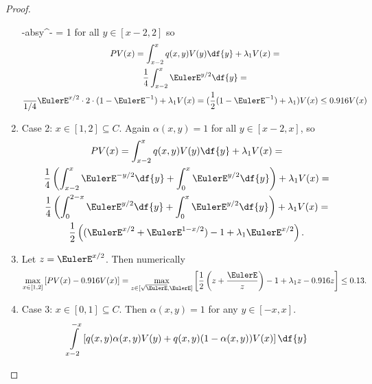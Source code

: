 \documentclass[12pt]{article}
\begin{document}
\begin{example}
\begin{proof}
\begin{enumerate}
{{                {-abs{y}}}{\EulerE^{-}}} = 1 \) for all \( y \in
                [x-2,2] \) so
                \begin{multline*}
                    PV(x) = \int_{x-2}^x q(x,y) V(y) \df{y} + \lambda_1
                    V(x) = \\
                    \frac{1}{4} \int_{x-2}^x \EulerE^{y/2} \df{y} =\\
                    \frac{}{1/4} \EulerE^{x/2}\cdot 2 \cdot (1 - \EulerE^
                    {-1}) + \lambda_1 V(x) = (\frac{1}{2}(1-\EulerE^{-1})
                    + \lambda_1) V(x) \le 0.916 V(x)
                \end{multline*}
            \item
                Case 2:  \( x \in [1,2] \subseteq C \).  Again \( \alpha
                (x,y) = 1 \) for all \( y \in [x-2,x] \), so
                \begin{multline*}
                    PV(x) = \int_{x-2}^x q(x,y) V(y) \df{y} + \lambda_1
                    V(x) = \\
                    \frac{1}{4} \left( \int_{x-2}^x \EulerE^{-y/2} \df{y}
                    + \int_0^x \EulerE^{y/2} \df{y} \right) + \lambda_1
                    V(x) =\\
                    \frac{1}{4} \left( \int_{0}^{2-x} \EulerE^{y/2} \df{y}
                    + \int_0^x \EulerE^{y/2} \df{y} \right) + \lambda_1
                    V(x) =\\
                    \frac{1}{2} \left( (\EulerE^{x/2} + \EulerE^{1-x/2})
                    - 1 + \lambda_1 \EulerE^{x/2} \right).
                \end{multline*}
            \item
                Let \( z = \EulerE^{x/2} \).  Then numerically
                \[
                    \max_{x \in [1,2]} \left[ PV(x) - 0.916 V(x)\right]
                    = \max_{z\in [\sqrt{\EulerE}, \EulerE]} \left[ \frac
                    {1}{2} \left(z + \frac{\EulerE}{z}\right) - 1 +
                    \lambda_1 z -0.916 z \right] \le 0.13.
                \]
            \item
                Case 3:  \( x \in [0,1] \subseteq C \).  Then \( \alpha(x,y)
                = 1 \) for any \( y \in [-x,x] \).
                \begin{align*}
                    &\int\limits_{x-2}^{-x} \left[ q(x,y) \alpha(x,y) V(y)
                    + q(x,y) ( 1 - \alpha(x,y))V(x) \right] \df{y} \\

\end{align*}
\end{enumerate}
\end{proof}
\end{example}
\end{document}

